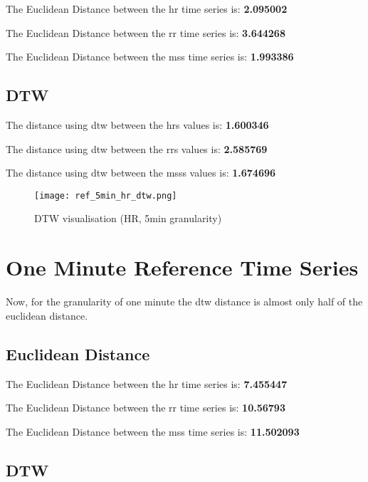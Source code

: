 The Euclidean Distance between the \ac{hr} time series is: \textbf{2.095002}


The Euclidean Distance between the \ac{rr} time series is: \textbf{3.644268}


The Euclidean Distance between the \ac{mss} time series is: \textbf{1.993386}


\subsection{DTW}

The distance using \ac{dtw} between the \acp{hr} values is: \textbf{1.600346}


The distance using \ac{dtw} between the \acp{rr} values is: \textbf{2.585769}


The distance using \ac{dtw} between the \acp{mss} values is: \textbf{1.674696}



\begin{figure}[h!]
	\texttt{[image: ref\_5min\_hr\_dtw.png]}
	\caption{DTW visualisation (HR, 5min granularity)}
	\label{fig:ref_dtw_dist_5_min_granularity}
\end{figure}






\clearpage
\section{One Minute Reference Time Series}

Now, for the granularity of one minute the \ac{dtw} distance is almost only half of the euclidean distance.

\subsection{Euclidean Distance}

The Euclidean Distance between the \ac{hr} time series is: \textbf{7.455447}


The Euclidean Distance between the \ac{rr} time series is: \textbf{10.56793}


The Euclidean Distance between the \ac{mss} time series is: \textbf{11.502093}



\subsection{DTW}


